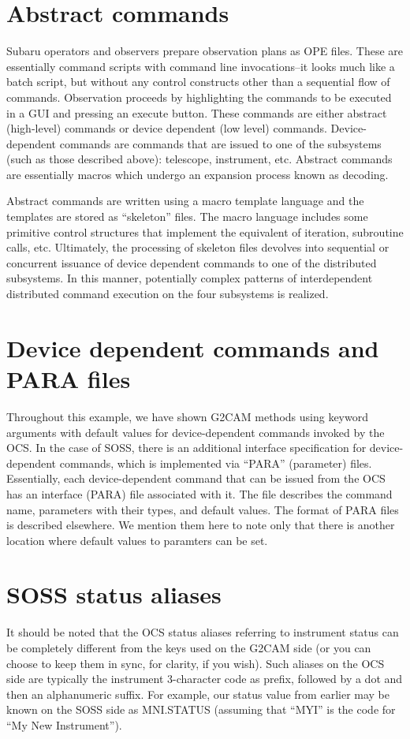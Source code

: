 \documentclass[11pt]{report}
\begin{document}
\section{Abstract commands}
Subaru operators and observers prepare observation plans as OPE
files. These are essentially command scripts with command line
invocations--it looks much like a batch script, but without any control
constructs other than a sequential flow of commands. Observation
proceeds by highlighting the commands to be executed in a GUI and
pressing an execute button. These commands are either abstract
(high-level) commands or device dependent (low level)
commands. Device-dependent commands are commands that are issued to one
of the subsystems (such as those described above): telescope,
instrument, etc. Abstract commands are essentially macros which undergo
an expansion process known as decoding. 

Abstract commands are written using a macro template language and the
templates are stored as ``skeleton'' files. The macro language includes
some primitive control structures that implement the equivalent of
iteration, subroutine calls, etc. Ultimately, the processing of skeleton
files devolves into sequential or concurrent issuance of device dependent
commands to one of the distributed subsystems. In this manner,
potentially complex patterns of interdependent distributed command
execution on the four subsystems is realized. 

\section{Device dependent commands and PARA files}
Throughout this example, we have shown G2CAM methods using keyword
arguments with default values for device-dependent commands invoked by
the OCS. In the case of SOSS, there is an additional interface
specification for device-dependent commands, which is implemented via
``PARA'' (parameter) files. Essentially, each device-dependent command
that can be issued from the OCS has an interface (PARA) file associated
with it. The file describes the command name, parameters with their
types, and default values. The format of PARA files is described
elsewhere. We mention them here to note only that there is another
location where default values to paramters can be set. 

\section{SOSS status aliases}
It should be noted that the OCS status aliases referring to instrument
status can be completely different from the keys used on the G2CAM side
(or you can choose to keep them in sync, for clarity, if you wish). Such
aliases on the OCS side are typically the instrument 3-character code as
prefix, followed by a dot and then an alphanumeric suffix. For example,
our status value from earlier may be known on the SOSS side as
MNI.STATUS (assuming that ``MYI'' is the code for ``My New Instrument''). 
\end{document}
